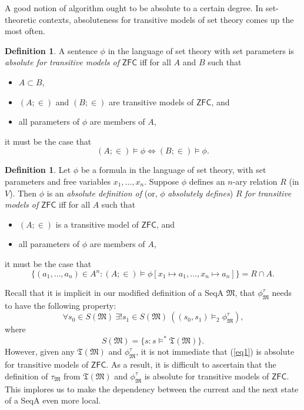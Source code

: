 \documentclass[12pt, twoside]{memoir}
\numberwithin{equation}{section}
\theoremstyle{definition}
\newtheorem{defi}[thm]{Definition}
\theoremstyle{remark}
\theoremstyle{definition}
\theoremstyle{definition}
\theoremstyle{definition}
\theoremstyle{remark}
\begin{document}
A good notion of algorithm ought to be absolute to a certain degree. In set-theoretic contexts, absoluteness for transitive models of set theory comes up the most often. 

\begin{defi}
A sentence $\phi$ in the language of set theory with set parameters is \emph{absolute for transitive models of} $\mathsf{ZFC}$ iff for all $A$ and $B$ such that
\begin{itemize}
    \item $A \subset B$,
    \item $(A; \in)$ and $(B; \in)$ are transitive models of $\mathsf{ZFC}$, and
    \item all parameters of $\phi$ are members of $A$,
\end{itemize}
it must be the case that
\begin{equation*}
    (A; \in) \models \phi \iff (B; \in) \models \phi \text{.}
\end{equation*}
\end{defi}

\begin{defi}
Let $\phi$ be a formula in the language of set theory, with set parameters and free variables $x_1, \dots, x_n$. Suppose $\phi$ defines an $n$-ary relation $R$ (in $V$). Then $\phi$ is an \emph{absolute definition of} (or, $\phi$ \emph{absolutely defines}) $R$ \emph{for transitive models of} $\mathsf{ZFC}$ iff for all $A$ such that
\begin{itemize}
    \item $(A; \in)$ is a transitive model of $\mathsf{ZFC}$, and
    \item all parameters of $\phi$ are members of $A$,
\end{itemize}
it must be the case that
\begin{equation*}
     \{(a_1, \dots, a_n) \in A^n : (A; \in) \models \phi[x_1 \mapsto a_1, \dots, x_n \mapsto a_n]\} = R \cap A \text{.}
\end{equation*}
\end{defi}

Recall that it is implicit in our modified definition of a SeqA $\mathfrak{M}$, that $\phi^{\tau}_{\mathfrak{M}}$ needs to have the following property:
\begin{equation}\label{eq1}
    \forall s_0 \in S(\mathfrak{M}) \ \exists ! s_1 \in S(\mathfrak{M}) \ ((s_0, s_1) \models_2 \phi^{\tau}_{\mathfrak{M}}) \text{,}
\end{equation}
where
\begin{equation*}
    S(\mathfrak{M}) = \{s : s \models^* \mathfrak{T}(\mathfrak{M})\} \text{.}
\end{equation*}
However, given any $\mathfrak{T}(\mathfrak{M})$ and $\phi^{\tau}_{\mathfrak{M}}$, it is not immediate that (\ref{eq1}) is absolute for transitive models of $\mathsf{ZFC}$. As a result, it is difficult to ascertain that the definition of $\tau_{\mathfrak{M}}$ from $\mathfrak{T}(\mathfrak{M})$ and $\phi^{\tau}_{\mathfrak{M}}$ is absolute for transitive models of $\mathsf{ZFC}$. This implores us to make the dependency between the current and the next state of a SeqA even more local.
\end{document}
